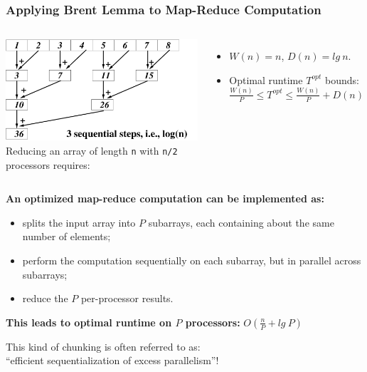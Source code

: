 \documentclass{beamer}
\renewcommand{\emph}[1]{\textcolor{CosGreen}{ #1}}
\newcommand{\emp}[1]{\textcolor{DikuRed}{ #1}}
\newtheorem{mytheo}{Theorem}
\begin{document}
\begin{frame}[fragile,t]
   \frametitle{Applying Brent Lemma to Map-Reduce Computation}

\begin{columns}
\includegraphics[height=13ex]{img/day3/ReduceEg.pdf} 
Reducing an array of length {\tt n} with {\tt n/2} processors requires:
\begin{itemize}
    \item $W(n) = n$, $D(n) = lg \ n$.
    \item Optimal runtime $T^{opt}$ bounds:\\
            $ \frac{W(n)}{P} \leq T^{opt} \leq \frac{W(n)}{P} + D(n)$
\end  {itemize}
\end{columns}\bigskip

{\bf An optimized map-reduce computation can be implemented as:}
\begin{itemize}
    \item splits the input array into $P$ subarrays, each containing 
            about the same number of elements;\smallskip
    \item perform the computation sequentially on each subarray,
            but in parallel across subarrays;\smallskip
    \item reduce the $P$ per-processor results.
\end{itemize}\medskip
{\bf This leads to optimal runtime on $P$ processors:}\pause \emph{$O(\frac{n}{P} + lg \ P)$}
\bigskip

\emp{This kind of chunking is often referred to as:}\\
\emp{``efficient sequentialization of excess parallelism''!}

\end{frame}

%
\end{document}
